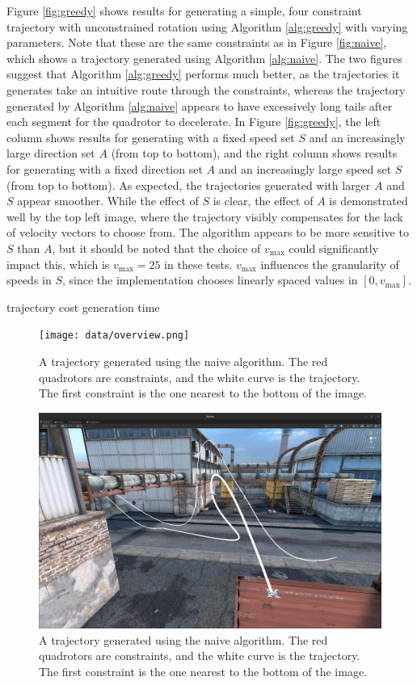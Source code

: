 \documentclass[pageno]{jpaper}
\begin{document}
Figure \ref{fig:greedy} shows results for generating a simple, four constraint trajectory with unconstrained rotation using Algorithm \ref{alg:greedy} with varying parameters. Note that these are the same constraints as in Figure \ref{fig:naive}, which shows a trajectory generated using Algorithm \ref{alg:naive}. The two figures suggest that Algorithm \ref{alg:greedy} performs much better, as the trajectories it generates take an intuitive route through the constraints, whereas the trajectory generated by Algorithm \ref{alg:naive} appears to have excessively long tails after each segment for the quadrotor to decelerate. In Figure \ref{fig:greedy}, the left column shows results for generating with a fixed speed set $S$ and an increasingly large direction set $A$ (from top to bottom), and the right column shows results for generating with a fixed direction set $A$ and an increasingly large speed set $S$ (from top to bottom). As expected, the trajectories generated with larger $A$ and $S$ appear smoother. While the effect of $S$ is clear, the effect of $A$ is demonstrated well by the top left image, where the trajectory visibly compensates for the lack of velocity vectors to choose from. The algorithm appears to be more sensitive to $S$ than $A$, but it should be noted that the choice of $v_{\max}$ could significantly impact this, which is $v_{\max} = 25$ in these tests. $v_{\max}$ influences the granularity of speeds in $S$, since the implementation chooses linearly spaced values in $[0, v_{\max}]$.


trajectory cost
generation time

\begin{figure}[hbt]
  \texttt{[image: data/overview.png]}
  \caption{A trajectory generated using the naive algorithm. The red quadrotors are constraints, and the white curve is the trajectory. The first constraint is the one nearest to the bottom of the image.}
  \label{fig:overview}
\end{figure}

\begin{figure}[hbt]
  \includegraphics[width=\linewidth]{data/landing.png}
  \caption{A trajectory generated using the naive algorithm. The red quadrotors are constraints, and the white curve is the trajectory. The first constraint is the one nearest to the bottom of the image.}
  \label{fig:landing}
\end{figure}
\end{document}
